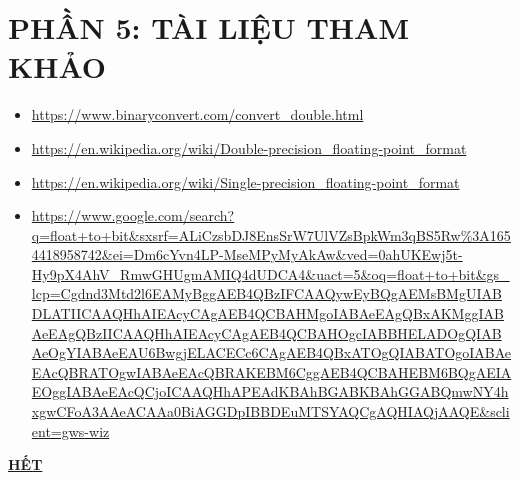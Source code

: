 \documentclass[12pt,a4paper]{article}
\begin{document}
\section{\textbf{\color{red}PHẦN 5: TÀI LIỆU THAM KHẢO}}
\begin{itemize}
    \item \url{https://www.binaryconvert.com/convert_double.html} \\
    \item \url{https://en.wikipedia.org/wiki/Double-precision_floating-point_format} \\
    \item \url{https://en.wikipedia.org/wiki/Single-precision_floating-point_format} \\
    \item \url{https://www.google.com/search?q=float+to+bit&sxsrf=ALiCzsbDJ8EnsSrW7UlVZsBpkWm3qBS5Rw%3A1654418958742&ei=Dm6cYvn4LP-MseMPyMyAkAw&ved=0ahUKEwj5t-Hy9pX4AhV_RmwGHUgmAMIQ4dUDCA4&uact=5&oq=float+to+bit&gs_lcp=Cgdnd3Mtd2l6EAMyBggAEB4QBzIFCAAQywEyBQgAEMsBMgUIABDLATIICAAQHhAIEAcyCAgAEB4QCBAHMgoIABAeEAgQBxAKMggIABAeEAgQBzIICAAQHhAIEAcyCAgAEB4QCBAHOgcIABBHELADOgQIABAeOgYIABAeEAU6BwgjELACECc6CAgAEB4QBxATOgQIABATOgoIABAeEAcQBRATOgwIABAeEAcQBRAKEBM6CggAEB4QCBAHEBM6BQgAEIAEOggIABAeEAcQCjoICAAQHhAPEAdKBAhBGABKBAhGGABQmwNY4hxgwCFoA3AAeACAAa0BiAGGDpIBBDEuMTSYAQCgAQHIAQjAAQE&sclient=gws-wiz} \\
\end{itemize}
\begin{center}
\LARGE \textbf\underline{{HẾT}}
\end{center}
\end{document}
